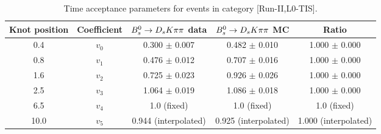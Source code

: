 \begin{table}[h]
\centering
\small
\caption{Time acceptance parameters for events in category [\textsf{Run-II},\textsf{L0-TIS}].}
\begin{tabular}{c c c c c}
\hline
\hline
Knot position & Coefficient & ${{B}^0_{s}}\rightarrow{\ensuremath{{D}_{s}}}{\ensuremath{K}}{\ensuremath{\pi}}{\ensuremath{\pi}}$ data & ${{B}^0_{s}}\rightarrow{\ensuremath{{D}_{s}}}{\ensuremath{K}}{\ensuremath{\pi}}{\ensuremath{\pi}}$ MC & Ratio \\
\hline
0.4 & $v_{0}$ & 0.300 $\pm$ 0.007 & 0.482 $\pm$ 0.010 & 1.000 $\pm$ 0.000\\
0.8 & $v_{1}$ & 0.476 $\pm$ 0.012 & 0.707 $\pm$ 0.016 & 1.000 $\pm$ 0.000\\
1.6 & $v_{2}$ & 0.725 $\pm$ 0.023 & 0.926 $\pm$ 0.026 & 1.000 $\pm$ 0.000\\
2.5 & $v_{3}$ & 1.064 $\pm$ 0.019 & 1.086 $\pm$ 0.018 & 1.000 $\pm$ 0.000\\
6.5 & $v_{4}$ &  1.0 (fixed) & 1.0 (fixed) & 1.0 (fixed)\\
10.0 & $v_{5}$ & 0.944 (interpolated) & 0.925 (interpolated) & 1.000 (interpolated) \\
\hline
\hline
\end{tabular}
\label{table:splines}
\end{table}
